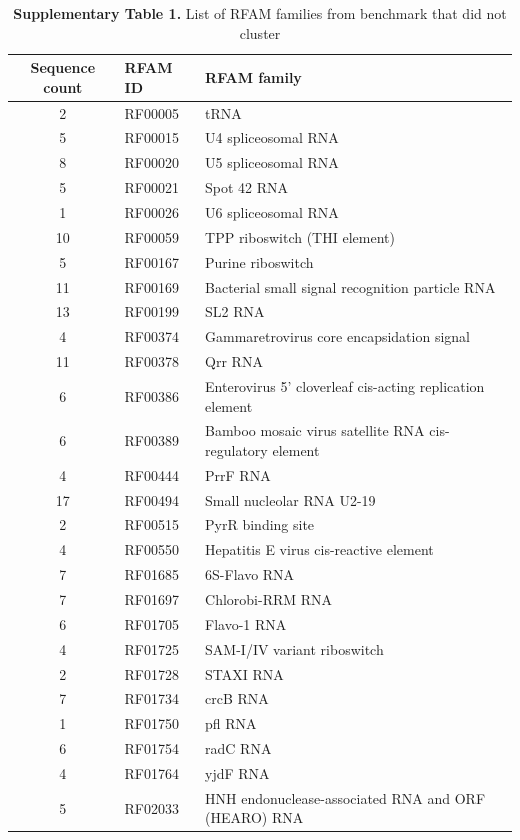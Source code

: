 \documentclass[a4paper,11pt]{article}
\begin{document}
\begin{table}
\centering
\caption*{\textbf{Supplementary Table 1.}  List of RFAM families from benchmark that did not cluster}
\begin{tabular}{cll}
\hline
Sequence count & RFAM ID & RFAM family \\
\hline
2 & RF00005 &  tRNA \\
5 & RF00015 &  U4 spliceosomal RNA \\
8 & RF00020 &  U5 spliceosomal RNA \\
5 & RF00021 &  Spot 42 RNA \\
1 & RF00026 &  U6 spliceosomal RNA \\
10 & RF00059 &  TPP riboswitch (THI element) \\
5 & RF00167 &  Purine riboswitch \\
11 & RF00169 &  Bacterial small signal recognition particle RNA \\
13 & RF00199 &  SL2 RNA \\
4 & RF00374 &  Gammaretrovirus core encapsidation signal \\
11 & RF00378 &  Qrr RNA \\
6 & RF00386 &  Enterovirus 5' cloverleaf cis-acting replication element \\
6 & RF00389 &  Bamboo mosaic virus satellite RNA cis-regulatory element \\
4 & RF00444 &  PrrF RNA \\
17 & RF00494 &  Small nucleolar RNA U2-19 \\
2 & RF00515 &  PyrR binding site \\
4 & RF00550 &  Hepatitis E virus cis-reactive element \\
7 & RF01685 &  6S-Flavo RNA \\
7 & RF01697 &  Chlorobi-RRM RNA \\
6 & RF01705 &  Flavo-1 RNA \\
4 & RF01725 &  SAM-I/IV variant riboswitch \\
2 & RF01728 &  STAXI RNA \\
7 & RF01734 &  crcB RNA \\
1 & RF01750 &  pfl RNA \\
6 & RF01754 &  radC RNA \\
4 & RF01764 &  yjdF RNA \\
5 & RF02033 &  HNH endonuclease-associated RNA and ORF (HEARO) RNA \\
\hline
\end{tabular}
\end{table}
\end{document}
